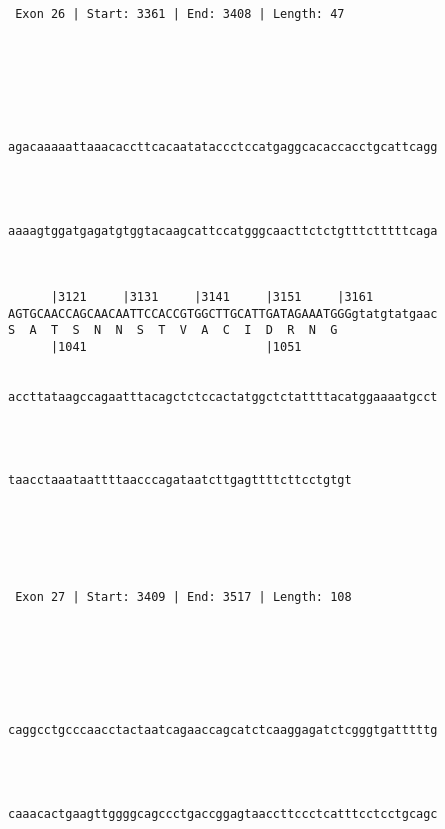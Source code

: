\documentclass{article}
\begin{document}
\begin{Verbatim}
 Exon 26 | Start: 3361 | End: 3408 | Length: 47 





   
                                                            
agacaaaaattaaacaccttcacaatataccctccatgaggcacaccacctgcattcagg
                                                            
                                                            
   
                                                            
aaaagtggatgagatgtggtacaagcattccatgggcaacttctctgtttctttttcaga
                                                            
                                                            
   
      |3121     |3131     |3141     |3151     |3161         
AGTGCAACCAGCAACAATTCCACCGTGGCTTGCATTGATAGAAATGGGgtatgtatgaac
S  A  T  S  N  N  S  T  V  A  C  I  D  R  N  G              
      |1041                         |1051                   
   
                                                            
accttataagccagaatttacagctctccactatggctctattttacatggaaaatgcct
                                                            
                                                            
   
                                                
taacctaaataattttaacccagataatcttgagttttcttcctgtgt
                                                
                                                
  



 Exon 27 | Start: 3409 | End: 3517 | Length: 108 





   
                                                            
caggcctgcccaacctactaatcagaaccagcatctcaaggagatctcgggtgatttttg
                                                            
                                                            
   
                                                            
caaacactgaagttggggcagccctgaccggagtaaccttccctcatttcctcctgcagc
                                                            
                                                            
   

\end{Verbatim}
\end{document}
